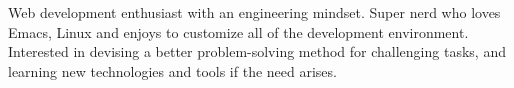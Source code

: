 

\begin{cvparagraph}

Web development enthusiast with an engineering mindset. Super nerd who loves Emacs, Linux and enjoys to customize all of the development environment. Interested in devising a better problem-solving method for challenging tasks, and learning new technologies and tools if the need arises.
\end{cvparagraph}
